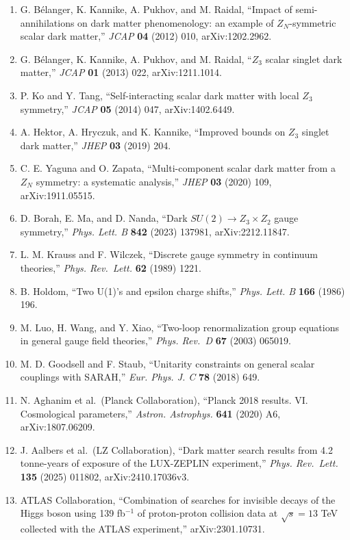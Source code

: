 \documentclass[
]{article}
\providecommand{\tightlist}{%
  \setlength{\itemsep}{0pt}\setlength{\parskip}{0pt}}
\begin{document}
\begin{enumerate}
\def\labelenumi{\arabic{enumi}.}
\tightlist
\item
  G. Bélanger, K. Kannike, A. Pukhov, and M. Raidal, ``Impact of
  semi-annihilations on dark matter phenomenology: an example of
  \(Z_N\)-symmetric scalar dark matter,'' \emph{JCAP} \textbf{04} (2012)
  010, arXiv:1202.2962.
\item
  G. Bélanger, K. Kannike, A. Pukhov, and M. Raidal, ``\(Z_3\) scalar
  singlet dark matter,'' \emph{JCAP} \textbf{01} (2013) 022,
  arXiv:1211.1014.
\item
  P. Ko and Y. Tang, ``Self-interacting scalar dark matter with local
  \(Z_3\) symmetry,'' \emph{JCAP} \textbf{05} (2014) 047,
  arXiv:1402.6449.
\item
  A. Hektor, A. Hryczuk, and K. Kannike, ``Improved bounds on \(Z_3\)
  singlet dark matter,'' \emph{JHEP} \textbf{03} (2019) 204.
\item
  C. E. Yaguna and O. Zapata, ``Multi-component scalar dark matter from
  a \(Z_N\) symmetry: a systematic analysis,'' \emph{JHEP} \textbf{03}
  (2020) 109, arXiv:1911.05515.
\item
  D. Borah, E. Ma, and D. Nanda, ``Dark \(SU(2)\to Z_3\times Z_2\) gauge
  symmetry,'' \emph{Phys. Lett. B} \textbf{842} (2023) 137981,
  arXiv:2212.11847.
\item
  L. M. Krauss and F. Wilczek, ``Discrete gauge symmetry in continuum
  theories,'' \emph{Phys. Rev.~Lett.} \textbf{62} (1989) 1221.
\item
  B. Holdom, ``Two U(1)'s and epsilon charge shifts,'' \emph{Phys. Lett.
  B} \textbf{166} (1986) 196.
\item
  M. Luo, H. Wang, and Y. Xiao, ``Two-loop renormalization group
  equations in general gauge field theories,'' \emph{Phys. Rev.~D}
  \textbf{67} (2003) 065019.
\item
  M. D. Goodsell and F. Staub, ``Unitarity constraints on general scalar
  couplings with SARAH,'' \emph{Eur. Phys. J. C} \textbf{78} (2018) 649.
\item
  N. Aghanim et al.~(Planck Collaboration), ``Planck 2018 results. VI.
  Cosmological parameters,'' \emph{Astron. Astrophys.} \textbf{641}
  (2020) A6, arXiv:1807.06209.
\item
  J. Aalbers et al.~(LZ Collaboration), ``Dark matter search results
  from 4.2 tonne-years of exposure of the LUX-ZEPLIN experiment,''
  \emph{Phys. Rev.~Lett.} \textbf{135} (2025) 011802,
  arXiv:2410.17036v3.
\item
  ATLAS Collaboration, ``Combination of searches for invisible decays of
  the Higgs boson using 139 fb\(^{-1}\) of proton-proton collision data
  at \(\sqrt{s}=13\) TeV collected with the ATLAS experiment,''
  arXiv:2301.10731.
\end{enumerate}
\end{document}
